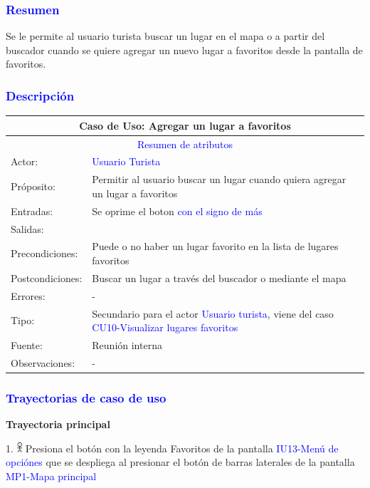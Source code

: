 \subsubsection{\textcolor{blue}{Resumen}}
 Se le permite al usuario turista buscar un lugar en el mapa o a partir del buscador cuando se quiere agregar un nuevo lugar a favoritos desde la pantalla de favoritos.
\subsubsection{\textcolor{blue}{Descripción}}
\begin{tabularx}{16cm}{||l|X||}
	\hline
	\multicolumn{2}{||c||}{Caso de Uso: Agregar un lugar a favoritos} \\
	\hline
	\multicolumn{2}{||c||}{\textcolor{blue}{Resumen de atributos}} \\
	\hline
	{Actor:} & {\textcolor{blue}{Usuario Turista}} \\
	\hline
	{Próposito:} & {Permitir al usuario buscar un lugar cuando quiera agregar un lugar a favoritos} \\
	\hline
	{Entradas:} & {Se oprime el boton \textcolor{blue}{con el signo de más}}\\
	\hline
	{Salidas:} & {}\\
	\hline
	{Precondiciones:} & {Puede o no haber un lugar favorito en la lista de lugares favoritos}\\ 
	\hline
	{Postcondiciones:} & {Buscar un lugar a través del buscador o mediante el mapa}\\
	\hline
	{Errores:} & {-} \\
	\hline
	{Tipo:} & {Secundario para el actor \textcolor{blue}{Usuario turista}, viene del caso \textcolor{blue}{CU10-Visualizar lugares favoritos}}\\
	\hline
	{Fuente:} & {Reunión interna} \\
	\hline
	{Observaciones:} & {-} \\
	\hline
\end{tabularx}

\pagebreak
\subsubsection{\textcolor{blue}{Trayectorias de caso de uso}}
\textbf{Trayectoria principal}
    
    1. \includegraphics[width=0.0150\textwidth]{Figuras/persona.png} Presiona el botón con la leyenda Favoritos de la pantalla  \textcolor{blue}{IU13-Menú de opciónes} que se despliega al presionar el botón de barras laterales de la pantalla \textcolor{blue}{MP1-Mapa principal}
    
